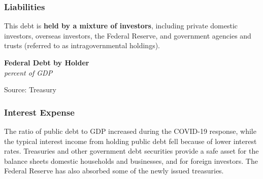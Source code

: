 \documentclass{report}
\makeatletter
\newcommand{\tbllink}[1]{\href{https://raw.githubusercontent.com/bdecon/US-chartbook/master/chartbook/data/#1}{\faTable}}
\newcommand*\short[1]{\expandafter\@gobbletwo\number\numexpr#1\relax}
\newcommand{\sbar}[4]{
		\addplot[ybar stacked, bar width=2.3pt, draw opacity=0, fill=#1] 
			table [x=#2, y=#3, col sep=comma]{#4};}
\newcommand{\dateaxisticks}{
		date coordinates in=x, axis line style={draw=none},
		xmax={2023-10-01},
		max space between ticks=40,	    
		xtick={{1990-01-01}, {1992-01-01}, {1994-01-01}, 
			{1996-01-01}, {1998-01-01}, {2000-01-01}, 
			{2002-01-01}, {2004-01-01}, {2006-01-01},
			{2008-01-01}, {2010-01-01}, {2012-01-01}, {2014-01-01},
		    {2016-01-01}, {2018-01-01}, {2020-01-01}, {2022-01-01}, 
		    {2024-01-01}, {2026-01-01}},
		minor xtick={{1989-01-01}, {1991-01-01}, {1993-01-01},
			{1995-01-01}, {1997-01-01}, {1999-01-01}, 
			{2001-01-01}, {2003-01-01}, {2005-01-01}, {2007-01-01},
		    {2009-01-01}, {2011-01-01}, {2013-01-01}, {2015-01-01},
		    {2017-01-01}, {2019-01-01}, {2021-01-01}, {2023-01-01}, 
		    {2025-01-01}, {2027-01-01}},
		enlarge y limits={0.06}, enlarge x limits={0.01},
		}
\newcommand{\bbar}[2]{extra #1 ticks = {{#2}}, extra #1 tick labels = ,
		extra #1 tick style = {grid=major, grid style={thick, black!25}},}
\newcommand{\rbars}{
		\fill[color=black!10] (axis cs:{1990-07-01},\pgfkeysvalueof{/pgfplots/ymin}) rectangle 
			(axis cs:{1991-03-01}, \pgfkeysvalueof{/pgfplots/ymax});
		\fill[color=black!10] (axis cs:{2007-12-01},\pgfkeysvalueof{/pgfplots/ymin}) rectangle 
			(axis cs:{2009-07-01}, \pgfkeysvalueof{/pgfplots/ymax});
		\fill[color=black!10] (axis cs:{2001-03-01},\pgfkeysvalueof{/pgfplots/ymin}) rectangle 
			(axis cs:{2001-11-01}, \pgfkeysvalueof{/pgfplots/ymax});
		\fill[color=black!10] (axis cs:{2020-02-01},\pgfkeysvalueof{/pgfplots/ymin}) rectangle 
			(axis cs:{2020-05-01}, \pgfkeysvalueof{/pgfplots/ymax});}
\makeatother
\begin{document}
{\begin{minipage}{0.76\textwidth}
\subsubsection*{Liabilities}
\small  This debt is \textbf{held by a mixture of investors}, including private domestic investors, overseas investors, the Federal Reserve, and government agencies and trusts (referred to as intragovernmental holdings). 


\vspace{1mm}

\normalsize \textbf{Federal Debt by Holder}\\
\footnotesize{\textit{percent of GDP}}
\vspace{3.0cm}

\hspace{4mm} 

\footnotesize{Source: Treasury} \hfill \tbllink{pubdebt.csv}
\vspace{0.51mm}

\subsubsection*{Interest Expense}
\small The ratio of public debt to GDP increased during the COVID-19 response, while the typical interest income from holding public debt fell because of lower interest rates. Treasuries and other government debt securities provide a safe asset for the balance sheets domestic households and businesses, and for foreign investors. The Federal Reserve has also absorbed some of the newly issued treasuries. 


\end{minipage}}
\end{document}
